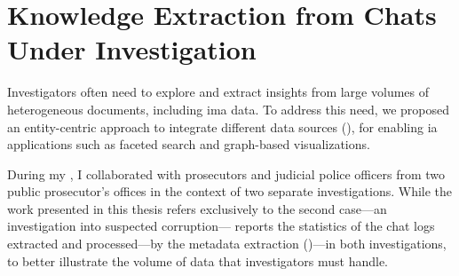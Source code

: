 \section{Knowledge Extraction from Chats Under Investigation}
\label{sec:eechats}







Investigators often need to explore and extract insights from large volumes of heterogeneous documents, including \acf{ima} data. To address this need, we proposed an entity-centric approach to integrate different data sources (), for enabling \acl{ia} applications such as faceted search and graph-based visualizations.

During my \phd, I collaborated with prosecutors and judicial police officers from two public prosecutor's offices in the context of two separate investigations. While the work presented in this thesis refers exclusively to the second case---an investigation into suspected corruption--- reports the statistics of the chat logs extracted and processed---by the metadata extraction ()---in both investigations, to better illustrate the volume of data that investigators must handle.

